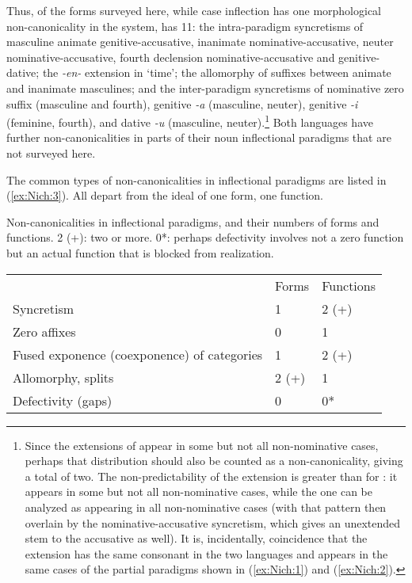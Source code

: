 \documentclass[output=collectionpaper]{langsci/langscibook}
\begin{document}
Thus, of the forms surveyed here, while  case inflection has one morphological non-canonicality in the system,  has 11: the intra-paradigm syncretisms of masculine animate genitive-accusative, inanimate nominative\hyp{}accusative, neuter nominative\hyp{}accusative, fourth declension nominative-accusative and genitive\hyp{}dative; the \textit{-en-} extension in `time'; the allomorphy of suffixes between animate and inanimate masculines; and the inter-paradigm syncretisms of nominative zero suffix (masculine and fourth), genitive \textit{-a} (masculine, neuter), genitive \textit{-i} (feminine, fourth), and dative \textit{-u} (masculine, neuter).\footnote{%
Since the extensions of  appear in some but not all non-nominative cases, perhaps that distribution should also be counted as a non-canonicality, giving  a total of two. The non-predictability of the  extension is greater than for : it appears in some but not all non-nominative cases, while the  one can be analyzed as appearing in all non-nominative cases (with that pattern then overlain by the nominative-accusative syncretism, which gives an unextended stem to the accusative as well). It is, incidentally, coincidence that the extension has the same consonant in the two languages and appears in the same cases of the partial paradigms shown in (\ref{ex:Nich:1}) and (\ref{ex:Nich:2}).
} %
Both languages have further non-canonicalities in parts of their noun inflectional paradigms that are not surveyed here.

The common types of non-canonicalities in inflectional paradigms are listed in (\ref{ex:Nich:3}). All depart from the ideal of one form, one function.

\ea
\label{ex:Nich:3}
Non-canonicalities in inflectional paradigms, and their numbers of forms and functions.  2 (+): two or more. 0*: perhaps defectivity involves not a zero function but an actual function that is blocked from realization.\\
\medskip
\begin{tabular}{lll}
						&		Forms &	Functions	\\
	Syncretism	 &					1 &	2 (+)	\\
	Zero affixes	 &					0 &	1	\\
	Fused exponence (coexponence) of categories	 &1 &	2 (+)	\\
	Allomorphy, splits		 &			2 (+)	 &1	\\
	Defectivity (gaps)		 &			0 &	0*
\end{tabular}
\z
\end{document}
